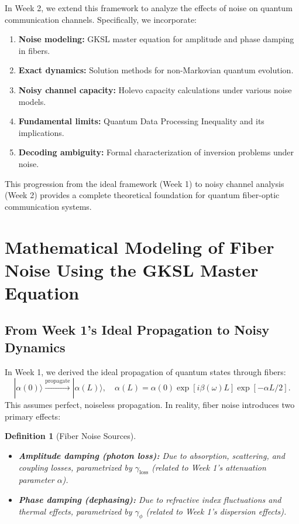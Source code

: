 \documentclass[12pt,a4paper]{article}
\newtheorem{definition}[theorem]{Definition}
\begin{document}
In Week 2, we extend this framework to analyze the effects of noise on quantum communication channels. Specifically, we incorporate:
\begin{enumerate}
    \item \textbf{Noise modeling:} GKSL master equation for amplitude and phase damping in fibers.
    \item \textbf{Exact dynamics:} Solution methods for non-Markovian quantum evolution.
    \item \textbf{Noisy channel capacity:} Holevo capacity calculations under various noise models.
    \item \textbf{Fundamental limits:} Quantum Data Processing Inequality and its implications.
    \item \textbf{Decoding ambiguity:} Formal characterization of inversion problems under noise.
\end{enumerate}

This progression from the ideal framework (Week 1) to noisy channel analysis (Week 2) provides a complete theoretical foundation for quantum fiber-optic communication systems.

\section{Mathematical Modeling of Fiber Noise Using the GKSL Master Equation}
\label{sec:gksl_modeling}

\subsection{From Week 1's Ideal Propagation to Noisy Dynamics}
In Week 1, we derived the ideal propagation of quantum states through fibers:
\[
|\alpha(0)\rangle \xrightarrow{\mathrm{propagate}} |\alpha(L)\rangle, \quad \alpha(L) = \alpha(0)\exp[i\beta(\omega)L]\exp[-\alpha L/2].
\]
This assumes perfect, noiseless propagation. In reality, fiber noise introduces two primary effects:

\begin{definition}[Fiber Noise Sources]
    \begin{itemize}
        \item \textbf{Amplitude damping (photon loss):} Due to absorption, scattering, and coupling losses, parametrized by $\gamma_{\text{loss}}$ (related to Week 1's attenuation parameter $\alpha$).
        \item \textbf{Phase damping (dephasing):} Due to refractive index fluctuations and thermal effects, parametrized by $\gamma_\phi$ (related to Week 1's dispersion effects).
    \end{itemize}
\end{definition}
\end{document}
